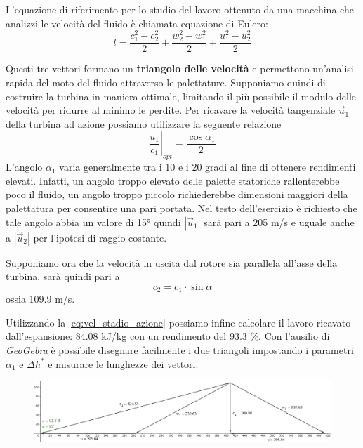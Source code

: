 \documentclass[a4paper,12pt]{article}
\begin{document}
L'equazione di riferimento per lo studio del lavoro ottenuto da una macchina che analizzi le velocità del fluido è chiamata equazione di Eulero:
\begin{equation}
    \label{eq:Eulero}
    l = \frac{c_1^2-c_2^2}{2} + \frac{w_2^2-w_1^2}{2} + \frac{u_1^2 - u_2^2}{2}
\end{equation}

Questi tre vettori formano un \textbf{triangolo delle velocità} e permettono un'analisi rapida del moto del fluido attraverso le palettature.
Supponiamo quindi di costruire la turbina in maniera ottimale, limitando il più possibile il modulo delle velocità per ridurre al minimo le perdite.
Per ricavare la velocità tangenziale $\vec u_1$ della turbina ad azione possiamo utilizzare la seguente relazione
\begin{equation}
    \left.\frac{u_1}{c_1}\right|_{opt} = \frac{\cos \alpha_1}{2}
\end{equation}
L'angolo $\alpha_1$ varia generalmente tra i 10 e i 20 gradi al fine di ottenere rendimenti elevati. Infatti, un angolo troppo elevato delle palette statoriche
rallenterebbe poco il fluido, un angolo troppo piccolo richiederebbe dimensioni maggiori della palettatura per consentire una pari portata.
Nel testo dell'esercizio è richiesto che tale angolo abbia un valore di 15° quindi $|\vec u_1|$ sarà pari a 205 m/s e uguale anche a $|\vec u_2|$ per l'ipotesi
di raggio costante.

Supponiamo ora che la velocità in uscita dal rotore sia parallela all'asse della turbina, sarà quindi pari a
\begin{equation}
    c_2 = c_1 \cdot \sin \alpha
\end{equation}
ossia 109.9 m/s.

Utilizzando la \eqref{eq:vel_stadio_azione} possiamo infine calcolare il lavoro ricavato dall'espansione: 84.08 kJ/kg con un rendimento del 93.3 \%.
Con l'ausilio di \textit{GeoGebra} è possibile disegnare facilmente i due triangoli impostando i parametri $\alpha_1$ e $\Delta h^*$ e misurare le lunghezze dei vettori.
\begin{figure}[H]
    \label{fig:triangoli_azione}
    \centering
    \includegraphics[width=\linewidth]{media/triangoli_azione.png}
\end{figure}
\end{document}
